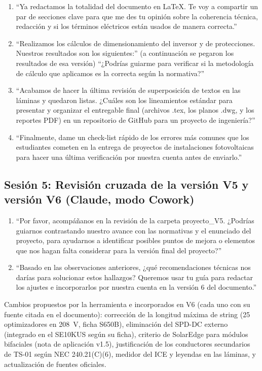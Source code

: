 \begin{enumerate}[resume]
    \item ``Ya redactamos la totalidad del documento en LaTeX. Te voy a compartir un par de secciones clave para que me des tu opinión sobre la coherencia técnica, redacción y si los términos eléctricos están usados de manera correcta.''
    \item ``Realizamos los cálculos de dimensionamiento del inversor y de protecciones. Nuestros resultados son los siguientes:'' (a continuación se pegaron los resultados de esa versión) ``¿Podrías guiarme para verificar si la metodología de cálculo que aplicamos es la correcta según la normativa?''
    \item ``Acabamos de hacer la última revisión de superposición de textos en las láminas y quedaron listas. ¿Cuáles son los lineamientos estándar para presentar y organizar el entregable final (archivos .tex, los planos .dwg, y los reportes PDF) en un repositorio de GitHub para un proyecto de ingeniería?''
    \item ``Finalmente, dame un check-list rápido de los errores más comunes que los estudiantes cometen en la entrega de proyectos de instalaciones fotovoltaicas para hacer una última verificación por nuestra cuenta antes de enviarlo.''
\end{enumerate}

\subsection*{Sesión 5: Revisión cruzada de la versión V5 y versión V6 (Claude, modo Cowork)}

\begin{enumerate}[resume]
    \item ``Por favor, acompáñanos en la revisión de la carpeta proyecto\_V5. ¿Podrías guiarnos contrastando nuestro avance con las normativas y el enunciado del proyecto, para ayudarnos a identificar posibles puntos de mejora o elementos que nos hagan falta considerar para la versión final del proyecto?''
    \item ``Basado en las observaciones anteriores, ¿qué recomendaciones técnicas nos darías para solucionar estos hallazgos? Queremos usar tu guía para redactar los ajustes e incorporarlos por nuestra cuenta en la versión 6 del documento.''
\end{enumerate}
Cambios propuestos por la herramienta e incorporados en V6 (cada uno con su fuente citada en el documento): corrección de la longitud máxima de string (25 optimizadores en 208~V, ficha S650B), eliminación del SPD-DC externo (integrado en el SE10KUS según su ficha), criterio de SolarEdge para módulos bifaciales (nota de aplicación v1.5), justificación de los conductores secundarios de TS-01 según NEC 240.21(C)(6), medidor del ICE y leyendas en las láminas, y actualización de fuentes oficiales.

